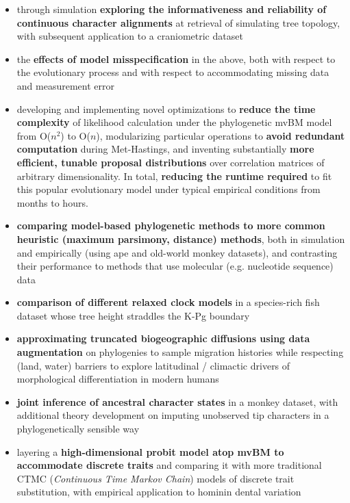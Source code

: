 \documentclass[12pt]{article}
\begin{document}
\begin{itemize}[noitemsep]

\item through simulation \textbf{exploring the informativeness and reliability of continuous character alignments} at retrieval of simulating tree topology, with subsequent application to a craniometric dataset 
\item the \textbf{effects of model misspecification} in the above, both with respect to the evolutionary process and with respect to accommodating missing data and measurement error
\item developing and implementing novel optimizations to \textbf{reduce the time complexity} of likelihood calculation under the phylogenetic mvBM model from O($n^2$) to O($n$), modularizing particular operations to \textbf{avoid redundant computation} during Met-Hastings, and inventing substantially \textbf{more efficient, tunable proposal distributions} over correlation matrices of arbitrary dimensionality. In total, \textbf{reducing the runtime required} to fit this popular evolutionary model under typical empirical conditions from months to hours. 
\item \textbf{comparing model-based phylogenetic methods to more common heuristic (maximum parsimony, distance) methods}, both in simulation and empirically (using ape and old-world monkey datasets), and contrasting their performance to methods that use molecular (e.g. nucleotide sequence) data
\item \textbf{comparison of different relaxed clock models} in a species-rich fish dataset whose tree height straddles the K-Pg boundary
\item \textbf{approximating truncated biogeographic diffusions using data augmentation} on phylogenies to sample migration histories while respecting (land, water) barriers to explore latitudinal / climactic drivers of morphological differentiation in modern humans 
\item \textbf{joint inference of ancestral character states} in a monkey dataset, with additional theory development on imputing unobserved tip characters in a phylogenetically sensible way 
\item layering a \textbf{high-dimensional probit model atop mvBM to accommodate discrete traits} and comparing it with more traditional CTMC (\emph{Continuous Time Markov Chain}) models of discrete trait substitution, with empirical application to hominin dental variation

\end{itemize}
\end{document}
